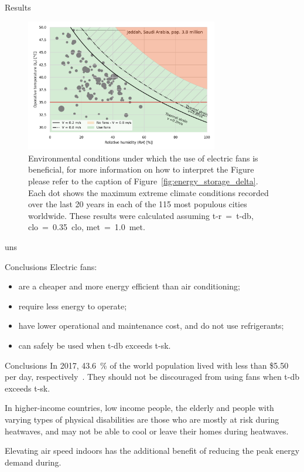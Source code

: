 \documentclass[aspectratio=169]{beamer}
\begin{document}
    \begin{frame}{Results}
        \begin{figure}[thb!]
            \centering
            \includegraphics[width=0.75\textwidth]{figures/use_fans_and_population}
            \caption{Environmental conditions under which the use of electric fans is beneficial, for more information on how to interpret the Figure please refer to the caption of Figure~\ref{fig:energy_storage_delta}.
            Each dot shows the maximum extreme climate conditions recorded over the last 20 years in each of the 115 most populous cities worldwide.
            These results were calculated assuming \ac{t-r}~=~\ac{t-db}, \ac{clo}~=~0.35~clo, \ac{met}~=~1.0~met.}
            \label{fig:use_fans_and_population}
        \end{figure}
    \end{frame}uns

    \begin{frame}{Conclusions}
        Electric fans:
        \begin{itemize}
            \item are a cheaper and more energy efficient than air conditioning;
            \item require less energy to operate;
            \item have lower operational and maintenance cost, and do not use refrigerants;
            \item can safely be used when \ac{t-db} exceeds \ac{t-sk}.
        \end{itemize}
    \end{frame}

    \begin{frame}{Conclusions}
        In 2017, 43.6~\% of the world population lived with less than \$5.50 per day, respectively~\cite{PovertyO1:online}.
        They should not be discouraged from using fans when \ac{t-db} exceeds \ac{t-sk}.

        In higher-income countries, low income people, the elderly and people with varying types of physical disabilities are those who are mostly at risk during heatwaves, and may not be able to cool or leave their homes during heatwaves.

        Elevating air speed indoors has the additional benefit of reducing the peak energy demand during.
    \end{frame}
\end{document}
